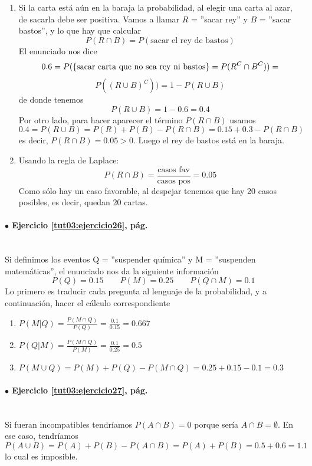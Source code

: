 \documentclass[10pt,a4paper]{article}\usepackage[]{graphicx}\usepackage[]{color}
\newcounter {cont01}
\begin{document}
\begin{enumerate}
\item Si la carta está aún en la baraja la probabilidad, al elegir una carta al  azar, de sacarla debe ser positiva. Vamos a llamar $R$ = ''sacar rey''  y $B$ = ''sacar bastos'', y lo que hay que calcular $$P(R\cap B)= 
P(\text{sacar el rey de bastos})$$
El enunciado nos dice 
$$0.6=P(\{\hbox{sacar carta que no sea rey ni bastos}\}=
P(R^C\cap B^C))=$$ 
$$P((R\cup B)^C))=1-P(R\cup B)$$
de donde tenemos 
$$P(R\cup B)=1-0.6=0.4$$
Por otro lado, para hacer aparecer el término $P(R\cap B)$ usamos 
$$0.4=P(R\cup B)=P(R)+P(B)-P(R\cap B)= 0.15+0.3-P(R\cap B)$$
es decir, $P(R\cap B)=0.05>0$. Luego el rey de bastos está en la baraja.
\item Usando la regla de Laplace: $$P(R\cap B)=\frac{\text{casos fav} }{\text{casos pos}}=0.05$$
Como sólo hay un caso favorable, al despejar tenemos que hay 20 casos posibles, es decir, quedan 20 cartas.
\end{enumerate}

\paragraph{\bf $\bullet$ Ejercicio \ref{tut03:ejercicio26}, pág. \pageref{tut03:ejercicio26}}
\label{tut03:ejercicio26:sol}\quad\\
Si definimos los eventos Q = ''suspender química'' y M = ''suspenden matemáticas'', el enunciado nos da la siguiente información
$$P(Q)=0\text{.}15\qquad P(M)=0\text{.}25\qquad P(Q\cap M)=0\text{.}1 $$
Lo primero es traducir cada pregunta al lenguaje de la probabilidad, y a continuación, hacer el cálculo correspondiente
\begin{enumerate}
\item $P(M|Q)=\frac{P(M\cap Q)}{P(Q)}=\frac{0\text{.}1}{0\text{.}15} = 0\text{.}667 $
\item $P(Q|M)=\frac{P(M\cap Q)}{P(M)}=\frac{0\text{.}1}{0\text{.}25}=0\text{.}5 $
\item $P(M\cup Q)= P(M) + P(Q) -P(M\cap Q)=0\text{.}25+0\text{.}15-0\text{.}1 =0\text{.}3 $
\end{enumerate}

\paragraph{\bf $\bullet$ Ejercicio \ref{tut03:ejercicio27}, pág. \pageref{tut03:ejercicio27}}
\label{tut03:ejercicio27:sol}\quad\\
Si fueran incompatibles tendríamos $P(A\cap B)=0$ porque sería $A\cap B=\emptyset$. En ese caso, tendríamos 
$$P(A\cup B)=P(A)+P(B)-P(A\cap B) =P(A)+P(B)=0\text{.}5+0\text{.}6=1\text{.}1$$
lo cual es imposible.
\end{document}

